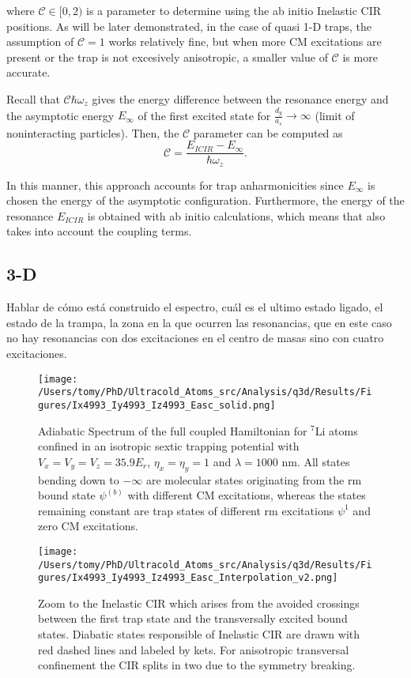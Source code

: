 \documentclass[aps,pre,twocolumn,superscriptaddress,showpacs]{revtex4-1}
\begin{document}
	where $\mathcal{C} \in [0, 2)$ is a parameter to determine using the ab initio Inelastic CIR positions. As will be later demonstrated, in the case of quasi 1-D traps, the assumption of $\mathcal{C}=1$ works relatively fine, but when more CM excitations are present or the trap is not excesively anisotropic, a smaller value of $\mathcal{C}$ is more accurate.
	
	Recall that $\mathcal{C} \hbar \omega_z$ gives the energy difference between the resonance energy and the asymptotic energy $E_{\infty}$ of the first excited state for $\frac{d_y}{a_s} \to \infty$ (limit of noninteracting particles). Then, the $\mathcal{C}$ parameter can be computed as
	\begin{equation}
		\mathcal{C} = \frac{E_{ICIR} - E_{\infty}}{\hbar \omega_z}.
	\end{equation}
	
	In this manner, this approach accounts for trap anharmonicities since $E_{\infty}$ is chosen the energy of the asymptotic configuration. Furthermore, the energy of the resonance $E_{ICIR}$ is obtained with ab initio calculations, which means that also takes into account the coupling terms.    

\subsection{3-D} \label{subsec:3D}
Hablar de cómo está construido el espectro, cuál es el ultimo estado ligado, el estado de la trampa, la zona en la que ocurren las resonancias, que en este caso no hay resonancias con dos excitaciones en el centro de masas sino con cuatro excitaciones.

	\begin{figure}[htbp!]
   	 \centering
    	\texttt{[image: /Users/tomy/PhD/Ultracold\_Atoms\_src/Analysis/q3d/Results/Figures/Ix4993\_Iy4993\_Iz4993\_Easc\_solid.png]}
    	\caption{Adiabatic Spectrum of the full coupled Hamiltonian for $^7$Li atoms confined in an isotropic sextic trapping potential with $V_x = V_y = V_z = 35.9E_r$, $\eta_x = \eta_y = 1$ and $\lambda=1000$ nm. All states bending down to $-\infty$ are molecular states originating from the rm bound state $\psi^{(b)}$ with different CM excitations, whereas the states remaining constant are trap states of different rm excitations $\psi^{1}$ and zero CM excitations.}
    	\label{fig:3D spectrum}
	\end{figure}
	
	\begin{figure}[htbp!]
   	 \centering
    	\texttt{[image: /Users/tomy/PhD/Ultracold\_Atoms\_src/Analysis/q3d/Results/Figures/Ix4993\_Iy4993\_Iz4993\_Easc\_Interpolation\_v2.png]}
    	\caption{Zoom to the Inelastic CIR which arises from the avoided crossings between the first trap state and the transversally excited bound states. Diabatic states responsible of Inelastic CIR are drawn with red dashed lines and labeled by kets. For anisotropic transversal confinement the CIR splits in two due to the symmetry breaking.}
    	\label{fig:Isotropic Crossings}
	\end{figure}
	
\end{document}
